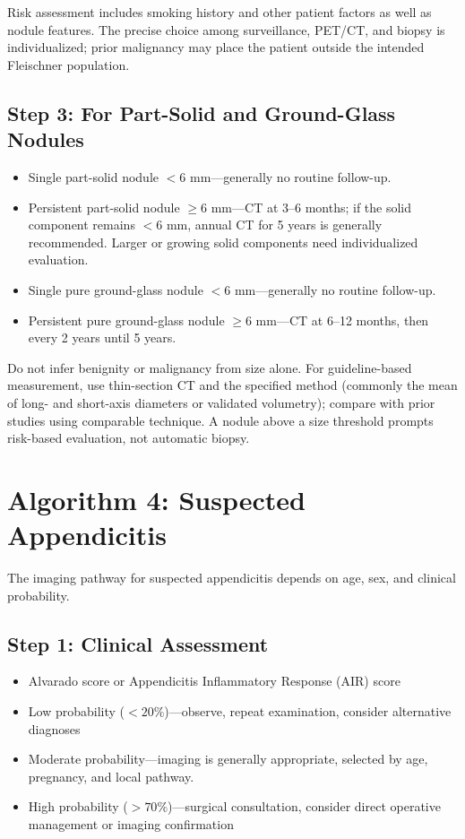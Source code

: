 Risk assessment includes smoking history and other patient factors as well as nodule features. The precise choice among surveillance, PET/CT, and biopsy is individualized; prior malignancy may place the patient outside the intended Fleischner population.

\subsection{Step 3: For Part-Solid and Ground-Glass Nodules}
\begin{itemize}
    \item Single part-solid nodule $<6$ mm---generally no routine follow-up.
    \item Persistent part-solid nodule $\geq6$ mm---CT at 3--6 months; if the solid component remains $<6$ mm, annual CT for 5 years is generally recommended. Larger or growing solid components need individualized evaluation.
    \item Single pure ground-glass nodule $<6$ mm---generally no routine follow-up.
    \item Persistent pure ground-glass nodule $\geq6$ mm---CT at 6--12 months, then every 2 years until 5 years.
\end{itemize}

\begin{pearlbox}
Do not infer benignity or malignancy from size alone. For guideline-based measurement, use thin-section CT and the specified method (commonly the mean of long- and short-axis diameters or validated volumetry); compare with prior studies using comparable technique. A nodule above a size threshold prompts risk-based evaluation, not automatic biopsy.
\end{pearlbox}

\clearpage

\section{Algorithm 4: Suspected Appendicitis}

The imaging pathway for suspected appendicitis depends on age, sex, and clinical probability.

\subsection{Step 1: Clinical Assessment}
\begin{itemize}
    \item Alvarado score or Appendicitis Inflammatory Response (AIR) score
    \item Low probability ($<20\%$)---observe, repeat examination, consider alternative diagnoses
    \item Moderate probability---imaging is generally appropriate, selected by age, pregnancy, and local pathway.
    \item High probability ($>70\%$)---surgical consultation, consider direct operative management or imaging confirmation
\end{itemize}

